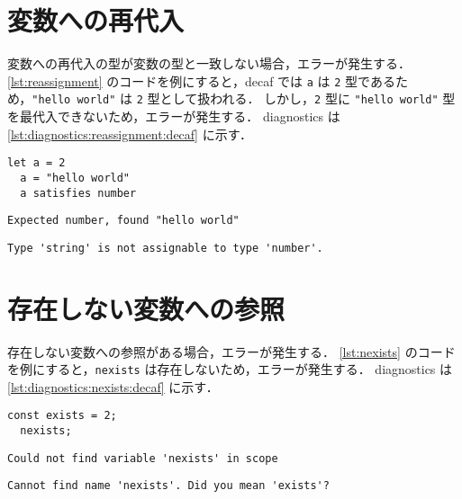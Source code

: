 \section{変数への再代入}

変数への再代入の型が変数の型と一致しない場合，エラーが発生する．
\ref{lst:reassignment} のコードを例にすると，decaf では \texttt{a} は \texttt{2} 型であるため，\texttt{"hello world"} は \texttt{2} 型として扱われる．
しかし，\texttt{2} 型に \texttt{"hello world"} 型を最代入できないため，エラーが発生する．
diagnostics は\ref{lst:diagnostics:reassignment:decaf} に示す．

\begin{lstlisting}[caption=変数への再代入の例, label=lst:reassignment]
  let a = 2
  a = "hello world"
  a satisfies number
\end{lstlisting}

\begin{minipage}{0.45\textwidth}
    \begin{lstlisting}[caption=decaf の diagnostics, label=lst:diagnostics:reassignment:decaf]
    Expected number, found "hello world"
  \end{lstlisting}
\end{minipage}
\hfill
\begin{minipage}{0.45\textwidth}
    \begin{lstlisting}[caption=tsc の diagnostics, label=lst:diagnostics:reassignment:tsc]
    Type 'string' is not assignable to type 'number'.
  \end{lstlisting}
\end{minipage}

\section{存在しない変数への参照}

存在しない変数への参照がある場合，エラーが発生する．
\ref{lst:nexists} のコードを例にすると，\texttt{nexists} は存在しないため，エラーが発生する．
diagnostics は\ref{lst:diagnostics:nexists:decaf} に示す．

\begin{lstlisting}[caption=存在しない変数への参照の例, label=lst:nexists]
  const exists = 2;
  nexists;
\end{lstlisting}

\begin{minipage}{0.45\textwidth}
    \begin{lstlisting}[caption=decaf の diagnostics, label=lst:diagnostics:nexists:decaf]
    Could not find variable 'nexists' in scope
  \end{lstlisting}
\end{minipage}
\hfill
\begin{minipage}{0.45\textwidth}
    \begin{lstlisting}[caption=tsc の diagnostics, label=lst:diagnostics:nexists:tsc]
    Cannot find name 'nexists'. Did you mean 'exists'?
  \end{lstlisting}
\end{minipage}

